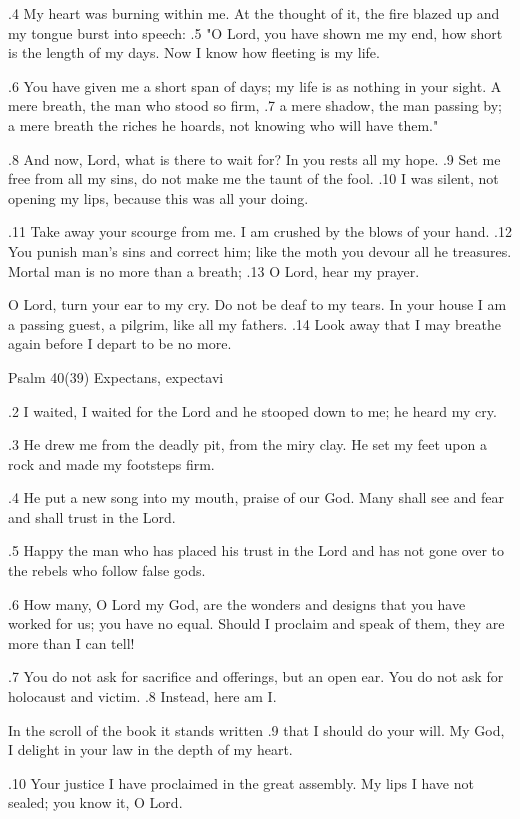 .4 My heart was burning within me.
At the thought of it, the fire blazed up
and my tongue burst into speech:
.5 "O Lord, you have shown me my end,
how short is the length of my days.
Now I know how fleeting is my life.

.6 You have given me a short span of days;
my life is as nothing in your sight.
A mere breath, the man who stood so firm,
.7 a mere shadow, the man passing by;
a mere breath the riches he hoards,
not knowing who will have them."

.8 And now, Lord, what is there to wait for?
In you rests all my hope.
.9 Set me free from all my sins,
do not make me the taunt of the fool.
.10 I was silent, not opening my lips,
because this was all your doing.

.11 Take away your scourge from me.
I am crushed by the blows of your hand.
.12 You punish man's sins and correct him;
like the moth you devour all he treasures.
Mortal man is no more than a breath;
.13 O Lord, hear my prayer.

O Lord, turn your ear to my cry.
Do not be deaf to my tears.
In your house I am a passing guest,
a pilgrim, like all my fathers.
.14 Look away that I may breathe again
before I depart to be no more.


Psalm 40(39) Expectans, expectavi

.2 I waited, I waited for the Lord
and he stooped down to me;
he heard my cry.

.3 He drew me from the deadly pit,
from the miry clay.
He set my feet upon a rock
and made my footsteps firm.

.4 He put a new song into my mouth,
praise of our God.
Many shall see and fear
and shall trust in the Lord.

.5 Happy the man who has placed
his trust in the Lord
and has not gone over to the rebels
who follow false gods.

.6 How many, O Lord my God,
are the wonders and designs
that you have worked for us;
you have no equal.
Should I proclaim and speak of them,
they are more than I can tell!

.7 You do not ask for sacrifice and offerings,
but an open ear.
You do not ask for holocaust and victim.
.8 Instead, here am I.

In the scroll of the book it stands written
.9 that I should do your will.
My God, I delight in your law
in the depth of my heart.

.10 Your justice I have proclaimed
in the great assembly.
My lips I have not sealed;
you know it, O Lord.


